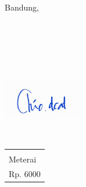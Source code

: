 \documentclass[11pt,a4paper,oneside,openright,notitlepage]{report}
\begin{document}
{{{	\begin{flushright}	
		Bandung,\ \vbulan\ \vtahun \\
		    {\begin{Form} \ \digsigfield{5cm}{2.25cm}{\vnama}\ \end{Form}\\}
		    {
		        {\includegraphics[width=3.5cm,height=3.5cm,keepaspectratio]{ttd}\\}
		        {{
		            {\vspace{0.5cm}
        		    \begin{tabular}{|p{1.75cm}|}\hline\\Meterai\\Rp. 6000\\ \hline\end{tabular}\\\vspace{0.5cm}}
        		    {\vspace{2.5cm}}
		        }
		        }    
        	}
		\vnama \\
		\vnpm
	\end{flushright}
	 \cleardoublepage 

}{}%

}}
\end{document}
